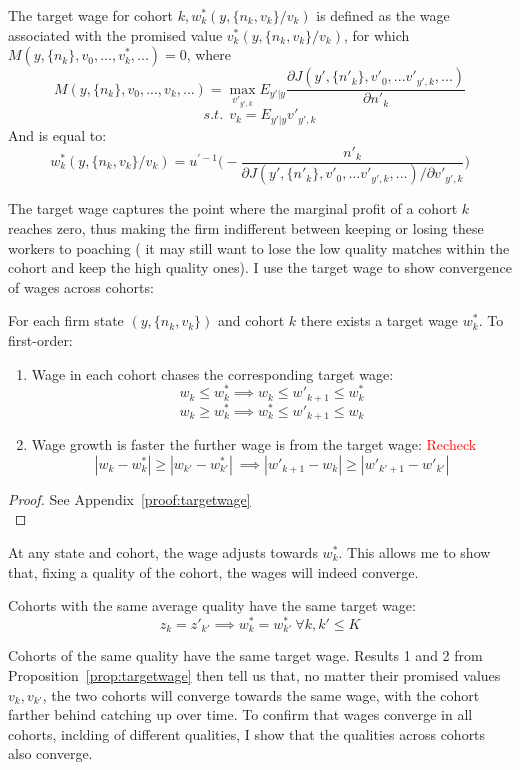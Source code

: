  \begin{definition} 
  The target wage for cohort $k, w^*_k(y,\{n_k,v_k\}/v_k)$ is defined as the wage associated with the promised value $v^*_k(y,\{n_k,v_k\}/v_k)$, for which $M(y,\{n_k\},v_0,...,v^*_k,...)=0$, where
  \[M(y,\{n_k\},v_0,...,v_k,...) = \max_{v'_{y',k}} E_{y'|y}\frac{\partial J(y',\{n'_k\},v'_0,...v'_{y',k},...)}{\partial n'_k}\]
  \[s.t. \: \: v_k = E_{y'|y} v'_{y',k}\]
  And is equal to:
  \[ w^*_k (y,\{n_k,v_k\}/v_k) = u^{'-1}\Big( - \frac{n'_k}{\partial J(y',\{n'_k\},v'_0,...v'_{y',k},...)/\partial v'_{y',k}} )\]
 \end{definition}
The target wage captures the point where the marginal profit of a cohort $k$ reaches zero, thus making the firm indifferent between keeping or losing these workers to poaching ( it may still want to lose the low quality matches within the cohort and keep the high quality ones). I use the target wage to show convergence of wages across cohorts:
\begin{proposition} \label{prop:targetwage}
 For each firm state $(y,\{n_k,v_k\})$ and cohort $k$ there exists a target wage $w^*_k$. To first-order:
  \begin{enumerate}
    \item Wage in each cohort chases the corresponding target wage: 
    \[ w_k \leq w^*_k  \implies w_k \leq w'_{k+1} \leq w^*_k\]
    \[w_k \geq w^*_k  \implies w^*_k \leq w'_{k+1} \leq w_k\]
    \item Wage growth is faster the further wage is from the target wage: \textcolor{red}{Recheck} 
    \[|w_k-w^*_k|\geq|w_{k'}-w^*_{k'}|\: \implies |w'_{k+1}-w_k|\geq|w'_{k'+1}-w'_{k'}| \]

  \end{enumerate}
\end{proposition}
\begin{proof}
  See Appendix~\ref{proof:targetwage} \\

\end{proof}
At any state and cohort, the wage adjusts towards $w^*_k$. This allows me to show that, fixing a quality of the cohort, the wages will indeed converge.
\begin{corollary}
  Cohorts with the same average quality have the same target wage:
  \[z_k=z'_{k'} \implies w^*_k=w^*_{k'} \: \forall k,k'\leq K\]
\end{corollary}
Cohorts of the same quality have the same target wage. Results 1 and 2 from Proposition~\ref{prop:targetwage} then tell us that, no matter their promised values $v_k,v_{k'}$, the two cohorts will converge towards the same wage, with the cohort farther behind catching up over time. To confirm that wages converge in all cohorts, inclding of different qualities, I show that the qualities across cohorts also converge.
